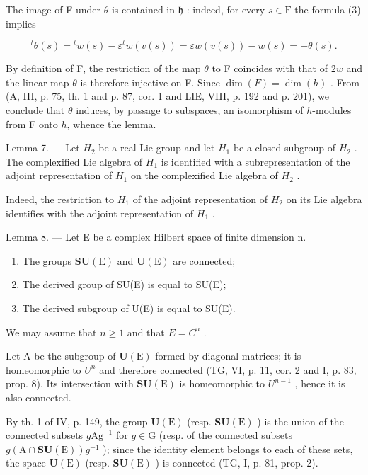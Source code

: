 The image of F under \(\theta\) is contained in \(\mathfrak{h}\) : indeed, for every \(s\in\mathrm{F}\) the formula (3) implies

\[
{ } ^ { t } \theta ( s ) = { } ^ { t } w ( s ) - \varepsilon { } ^ { t } w ( v ( s ) ) = \varepsilon w ( v ( s ) ) - w ( s ) = - \theta ( s ) .
\]

By definition of F, the restriction of the map \(\theta\) to F coincides with that of \(2w\) and the linear map \(\theta\) is therefore injective on F. Since \(\dim(F) = \dim(h)\) . From (A, III, p. 75, th. 1 and p. 87, cor. 1 and LIE, VIII, p. 192 and p. 201), we conclude that \(\theta\) induces, by passage to subspaces, an isomorphism of \(h\)-modules from F onto \(h\), whence the lemma.

Lemma 7. --- Let \(H_{2}\) be a real Lie group and let \(H_{1}\) be a closed subgroup of \(H_{2}\) . The complexified Lie algebra of \(H_{1}\) is identified with a subrepresentation of the adjoint representation of \(H_{1}\) on the complexified Lie algebra of \(H_{2}\) .

Indeed, the restriction to \(H_{1}\) of the adjoint representation of \(H_{2}\) on its Lie algebra identifies with the adjoint representation of \(H_{1}\) .

Lemma 8. --- Let E be a complex Hilbert space of finite dimension n.

\begin{enumerate}
\def\labelenumi{\alph{enumi})}
\item
  The groups \(\mathbf{SU}(\mathrm{E})\) and \(\mathbf{U}(\mathrm{E})\) are connected;
\item
  The derived group of SU(E) is equal to SU(E);
\item
  The derived subgroup of U(E) is equal to SU(E).
\end{enumerate}

We may assume that \(n \geqslant 1\) and that \(E = C^{n}\) .

Let A be the subgroup of \(\mathbf{U}(\mathrm{E})\) formed by diagonal matrices; it is homeomorphic to \(U^{n}\) and therefore connected (TG, VI, p. 11, cor. 2 and I, p. 83, prop. 8). Its intersection with \(\mathbf{SU}(\mathrm{E})\) is homeomorphic to \(U^{n-1}\) , hence it is also connected.

By th. 1 of IV, p. 149, the group \(\mathbf{U}(\mathrm{E})\) (resp. \(\mathbf{SU}(\mathrm{E})\) ) is the union of the connected subsets \(g\mathrm{Ag}^{-1}\) for \(g \in \mathrm{G}\) (resp. of the connected subsets \(g(\mathrm{A} \cap \mathbf{SU}(\mathrm{E}))g^{-1}\) ); since the identity element belongs to each of these sets, the space \(\mathbf{U}(\mathrm{E})\) (resp. \(\mathbf{SU}(\mathrm{E})\) ) is connected (TG, I, p. 81, prop. 2).

